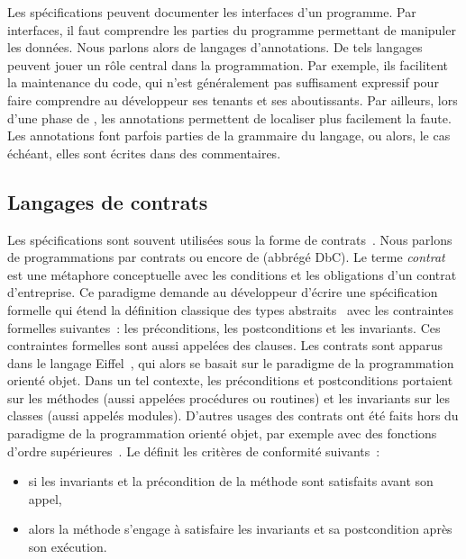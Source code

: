 Les spécifications peuvent documenter les {\strong interfaces} d'un programme.
Par interfaces, il faut comprendre les parties du programme permettant de
manipuler les données. Nous parlons alors de {\strong langages d'annotations}.
De tels langages peuvent jouer un rôle central dans la programmation. Par
exemple, ils facilitent la maintenance du code, qui n'est généralement pas
suffisament expressif pour faire comprendre au développeur ses tenants et ses
aboutissants. Par ailleurs, lors d'une phase de , les
annotations permettent de localiser plus facilement la faute. Les annotations
font parfois parties de la grammaire du langage, ou alors, le cas échéant, elles
sont écrites dans des {\strong commentaires}.

\subsection{Langages de contrats}
\label{subsection:sota:dbc}

Les spécifications sont souvent utilisées sous la forme de {\strong
contrats}~. Nous parlons de programmations par contrats
ou encore de  (abbrégé DbC). Le terme {\em
contrat} est une métaphore conceptuelle avec les conditions et les obligations
d'un contrat d'entreprise. Ce paradigme demande au développeur d'écrire une
spécification formelle qui étend la définition classique des types
abstraits~ avec les contraintes formelles suivantes~: les
{\strong préconditions}, les {\strong postconditions} et les {\strong
invariants}. Ces contraintes formelles sont aussi appelées des {\strong
clauses}. Les contrats sont apparus dans le langage Eiffel~,
qui alors se basait sur le paradigme de la programmation orienté objet. Dans un
tel contexte, les préconditions et postconditions portaient sur les méthodes
(aussi appelées procédures ou routines) et les invariants sur les classes (aussi
appelés modules). D'autres usages des contrats ont été faits hors du paradigme
de la programmation orienté objet, par exemple avec des fonctions d'ordre
supérieures~. Le  définit les
critères de conformité suivants~:

\begin{itemize}

\item si les invariants et la précondition de la méthode sont satisfaits avant
son appel,

\item alors la méthode s'engage à satisfaire les invariants et sa postcondition
après son exécution.

\end{itemize}

